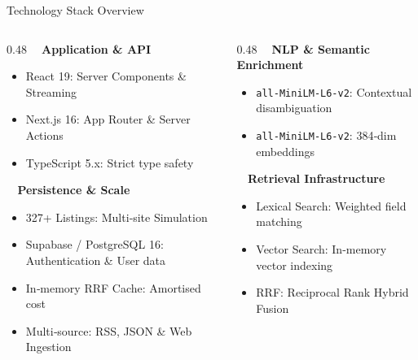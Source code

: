 \documentclass[aspectratio=169, 10pt]{beamer}
\begin{document}
    \begin{frame}{Technology Stack Overview}
        \begin{columns}[T]
            \begin{column}{0.48\textwidth}
                \textbf{\faCode~ Application \& API}
                \begin{itemize}
                    \item React 19: Server Components \& Streaming
                    \item Next.js 16: App Router \& Server Actions
                    \item TypeScript 5.x: Strict type safety
                \end{itemize}
                \vspace{0.3cm}
                \textbf{\faDatabase~ Persistence \& Scale}
                \begin{itemize}
                    \item 327+ Listings: Multi‑site Simulation
                    \item Supabase / PostgreSQL 16: Authentication \& User data
                    \item In‑memory RRF Cache: Amortised cost
                    \item Multi‑source: RSS, JSON \& Web Ingestion
                \end{itemize}
            \end{column}
            \begin{column}{0.48\textwidth}
                \textbf{\faRobot~ NLP \& Semantic Enrichment}
                \begin{itemize}
                    \item \texttt{all-MiniLM-L6-v2}: Contextual disambiguation
                    \item \texttt{all-MiniLM-L6-v2}: 384‑dim embeddings
                \end{itemize}
                \vspace{0.3cm}
                \textbf{\faSearch~ Retrieval Infrastructure}
                \begin{itemize}
                    \item Lexical Search: Weighted field matching
                    \item Vector Search: In-memory vector indexing
                    \item RRF: Reciprocal Rank Hybrid Fusion
                \end{itemize}
            \end{column}
        \end{columns}
    \end{frame}
\end{document}
